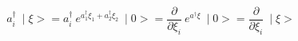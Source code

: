 \begin{equation}
a_i^\dag ~\mid \xi>= a_i^\dag~ e^{a_1^\dag \xi_1 + a_2^\dag \xi_2}~\mid 0>= \frac{\partial}{\partial \xi_i}~ e^{a^\dag \xi}~\mid 0>= \frac{\partial}{\partial \xi_i}~\mid \xi>
\end{equation}

